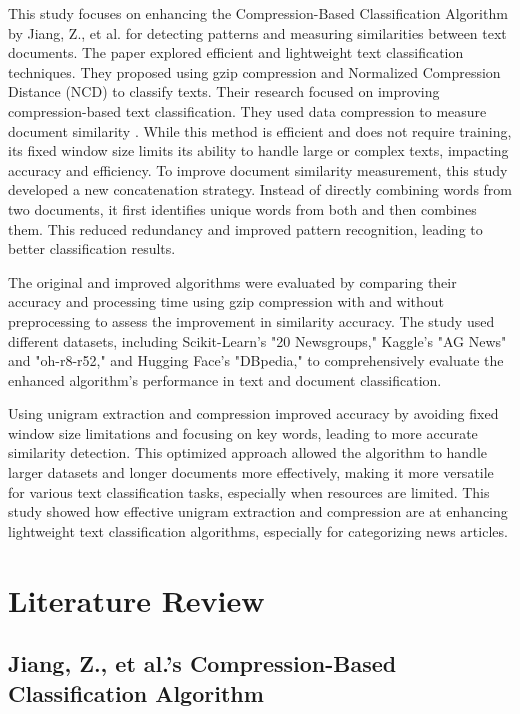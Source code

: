 \documentclass{article}
\begin{document}
This study focuses on enhancing the Compression-Based Classification Algorithm by Jiang, Z., et al. for detecting patterns and measuring similarities between text documents. The paper explored efficient and lightweight text classification techniques. They proposed using gzip compression and Normalized Compression Distance (NCD) to classify texts. Their research focused on improving compression-based text classification. They used data compression to measure document similarity \cite{Jiang2022}. While this method is efficient and does not require training, its fixed window size limits its ability to handle large or complex texts, impacting accuracy and efficiency. To improve document similarity measurement, this study developed a new concatenation strategy. Instead of directly combining words from two documents, it first identifies unique words from both and then combines them. This reduced redundancy and improved pattern recognition, leading to better classification results.

The original and improved algorithms were evaluated by comparing their accuracy and processing time using gzip compression with and without preprocessing to assess the improvement in similarity accuracy. The study used different datasets, including Scikit-Learn's "20 Newsgroups," Kaggle's "AG News" and "oh-r8-r52," and Hugging Face's "DBpedia," to comprehensively evaluate the enhanced algorithm's performance in text and document classification.

Using unigram extraction and compression improved accuracy by avoiding fixed window size limitations and focusing on key words, leading to more accurate similarity detection. This optimized approach allowed the algorithm to handle larger datasets and longer documents more effectively, making it more versatile for various text classification tasks, especially when resources are limited. This study showed how effective unigram extraction and compression are at enhancing lightweight text classification algorithms, especially for categorizing news articles.

\section{Literature Review}

\subsection{Jiang, Z., et al.’s Compression-Based Classification Algorithm}
\end{document}
